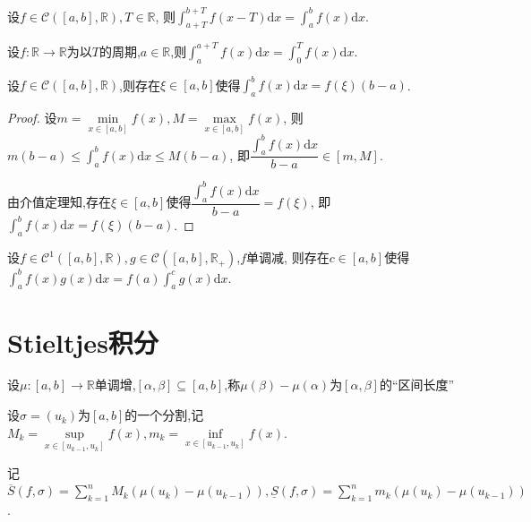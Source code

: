 \begin{prop}
    设$f\in\mathcal{C}([a,b],\mathbb{R}),T\in\mathbb{R}$,
    则$\int_{a+T}^{b+T} f(x-T)\mathrm{d}x=\int_a^b f(x)\mathrm{d}x$.
\end{prop}

\begin{prop}
    设$f:\mathbb{R}\to\mathbb{R}$为以$T$的周期,$a\in\mathbb{R}$,则$\int_a^{a+T}f(x)\mathrm{d}x=\int_0^T f(x)\mathrm{d}x$.
\end{prop}

\begin{thm}[第一积分中值]
    设$f\in\mathcal{C}([a,b],\mathbb{R})$,则存在$\xi\in[a,b]$使得$\int_a^b f(x)\mathrm{d}x=f(\xi)(b-a)$.
\end{thm}

\begin{proof}
    设$m=\min\limits_{x\in[a,b]}f(x),M=\max\limits_{x\in[a,b]}f(x)$,
    则$m(b-a)\leqslant\int_a^bf(x)\mathrm{d}x\leqslant M(b-a)$,
    即$\dfrac{\int_a^b f(x)\mathrm{d}x}{b-a}\in[m,M]$.

    由介值定理知,存在$\xi\in[a,b]$使得$\dfrac{\int_a^b f(x)\mathrm{d}x}{b-a}=f(\xi)$,
    即$\int_a^b f(x)\mathrm{d}x=f(\xi)(b-a)$.
\end{proof}

\begin{thm}[第二积分中值]
    设$f\in\mathcal{C}^1([a,b],\mathbb{R}),g\in\mathcal{C}([a,b],\mathbb{R}_+)$,$f$单调减,
    则存在$c\in[a,b]$使得$\int_a^b f(x)g(x)\mathrm{d}x=f(a)\int_a^c g(x)\mathrm{d}x$.
\end{thm}

\section{Stieltjes积分}

\begin{deff}
    设$\mu:[a,b]\to\mathbb{R}$单调增,$[\alpha,\beta]\subseteq[a,b]$,称$\mu(\beta)-\mu(\alpha)$为$[\alpha,\beta]$的``区间长度''
\end{deff}

\begin{deff}
    设$\sigma=(u_k)$为$[a,b]$的一个分割,记$M_k=\sup\limits_{x\in[u_{k-1},u_k]}f(x),m_k=\inf\limits_{x\in[u_{k-1},u_k]}f(x)$.

    记$\overline{S}(f,\sigma)=\sum\limits_{k=1}^n M_k(\mu(u_k)-\mu(u_{k-1})),\underline{S}(f,\sigma)=\sum\limits_{k=1}^n m_k(\mu(u_k)-\mu(u_{k-1}))$.
\end{deff}


